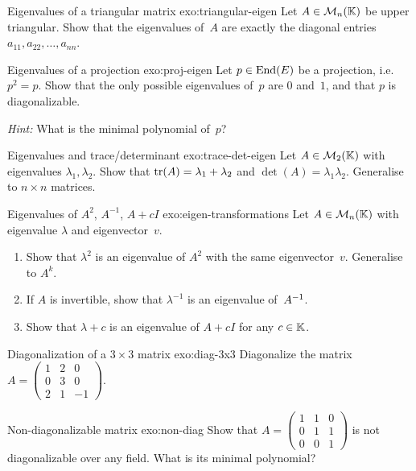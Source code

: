 \begin{exercise}{Eigenvalues of a triangular matrix \basic}%
{exo:triangular-eigen}
Let $A\in\mathcal{M}_n({\mathbb{K}})$ be upper triangular.  Show that the eigenvalues
of~$A$ are exactly the diagonal entries $a_{11},a_{22},\ldots,a_{nn}$.
\end{exercise}

\begin{exercise}{Eigenvalues of a projection \basic}{exo:proj-eigen}
Let $p\in\operatorname{End}(E)$ be a projection, i.e.\ $p^2 = p$.  Show that the
only possible eigenvalues of~$p$ are $0$ and~$1$, and that $p$ is
diagonalizable.

\noindent\textit{Hint:} What is the minimal polynomial of~$p$?
\end{exercise}

\begin{exercise}{Eigenvalues and trace/determinant \basic}%
{exo:trace-det-eigen}
Let $A\in\mathcal{M}_2({\mathbb{K}})$ with eigenvalues $\lambda_1,\lambda_2$.  Show
that $\operatorname{tr}(A) = \lambda_1 + \lambda_2$ and
$\det(A) = \lambda_1\lambda_2$.  Generalise to $n\times n$ matrices.
\end{exercise}

\begin{exercise}{Eigenvalues of $A^2$, $A^{-1}$, $A + cI$ \intermediate}%
{exo:eigen-transformations}
Let $A\in\mathcal{M}_n({\mathbb{K}})$ with eigenvalue $\lambda$ and eigenvector~$v$.
\begin{enumerate}[label=(\alph*)]
  \item Show that $\lambda^2$ is an eigenvalue of $A^2$ with the same
    eigenvector~$v$.  Generalise to $A^k$.
  \item If $A$ is invertible, show that $\lambda^{-1}$ is an eigenvalue
    of~${A}^{-1}$.
  \item Show that $\lambda + c$ is an eigenvalue of $A + cI$ for
    any $c\in{\mathbb{K}}$.
\end{enumerate}
\end{exercise}

\begin{exercise}{Diagonalization of a $3\times 3$ matrix \intermediate}%
{exo:diag-3x3}
Diagonalize the matrix
$A = \begin{pmatrix} 1 & 2 & 0 \\ 0 & 3 & 0 \\ 2 & 1 & -1 \end{pmatrix}$.
\end{exercise}

\begin{exercise}{Non-diagonalizable matrix \intermediate}{exo:non-diag}
Show that $A = \begin{pmatrix} 1 & 1 & 0 \\ 0 & 1 & 1 \\
0 & 0 & 1 \end{pmatrix}$ is not diagonalizable over any field.
What is its minimal polynomial?
\end{exercise}

